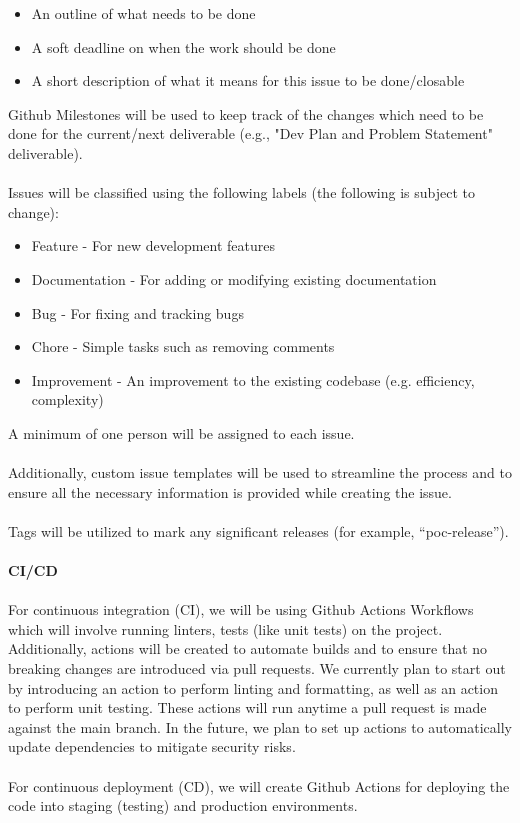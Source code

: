 \documentclass{article}
\begin{document}
\begin{itemize}
  \item An outline of what needs to be done
  \item A soft deadline on when the work should be done
  \item A short description of what it means for this issue to be done/closable
\end{itemize}
Github Milestones will be used to keep track of the changes which
need to be done for the current/next
deliverable (e.g., "Dev Plan and Problem Statement" deliverable).\\
\\
Issues will be classified using the following labels (the following
is subject to change):
\begin{itemize}
  \item Feature - For new development features
  \item Documentation - For adding or modifying existing documentation
  \item Bug - For fixing and tracking bugs
  \item Chore - Simple tasks such as removing comments
  \item Improvement - An improvement to the existing codebase (e.g.
    efficiency, complexity)
\end{itemize}
A minimum of one person will be assigned to each issue.\\
\\
Additionally, custom issue templates will be used to streamline the
process and to ensure all the necessary
information is provided while creating the issue.\\
\\
Tags will be utilized to mark any significant releases (for example,
“poc-release”).\\
\\
\textbf{CI/CD}\\
\\
For continuous integration (CI), we will be using Github Actions
Workflows which will involve running linters,
tests (like unit tests) on the project. Additionally, actions will be
created to automate builds and to ensure that
no breaking changes are introduced via pull requests. We currently
plan to start out by introducing an action
to perform linting and formatting, as well as an action to perform
unit testing. These actions will run anytime a
pull request is made against the main branch. In the future, we plan
to set up actions to automatically update
dependencies to mitigate security risks.\\
\\
For continuous deployment (CD), we will create Github Actions for
deploying the code into staging (testing)
and production environments.
\end{document}
